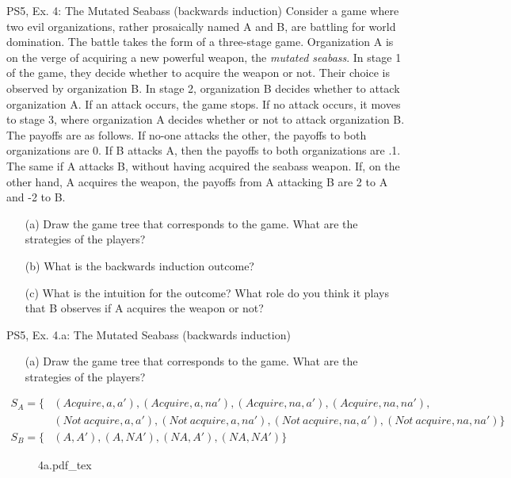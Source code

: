 







\begin{frame}{PS5, Ex. 4: The Mutated Seabass (backwards induction)}
    Consider a game where two evil organizations, rather prosaically named A and B, are battling for world domination. The battle takes the form of a three-stage game. Organization A is on the verge of acquiring a new powerful weapon, the \textit{mutated seabass}. In stage 1 of the game, they decide whether to acquire the weapon or not. Their choice is observed by organization B. In stage 2, organization B decides whether to attack organization A. If an attack occurs, the game stops. If no attack occurs, it moves to stage 3, where organization A decides whether or not to attack organization B. The payoffs are as follows. If no-one attacks the other, the payoffs to both organizations are 0. If B attacks A, then the payoffs to both organizations are .1. The same if A attacks B, without having acquired the seabass weapon. If, on the other hand, A acquires the weapon, the payoffs from A attacking B are 2 to A and -2 to B.
    \begin{itemize}
      \item[(a)] Draw the game tree that corresponds to the game. What are the strategies of the players?
      \item[(b)] What is the backwards induction outcome?
      \item[(c)] What is the intuition for the outcome? What role do you think it plays that B observes if A acquires the weapon or not?
    \end{itemize}
  \vfill\null
\end{frame}

\begin{frame}{PS5, Ex. 4.a: The Mutated Seabass (backwards induction)}
  \begin{itemize}
    \item[(a)] Draw the game tree that corresponds to the game. What are the strategies of the players?
  \end{itemize}
  \vspace{-8pt}
  \begin{align*}
    S_A=\{ &(Acquire, a, a'), (Acquire, a, na'), (Acquire, na, a'), (Acquire, na, na'),\\
            &(Not\ acquire, a, a'), (Not\ acquire, a, na'), (Not\ acquire, na, a'), (Not\ acquire, na, na') \}\\
    S_B=\{ &(A, A'), (A, NA'), (NA, A'), (NA, NA') \}
  \end{align*}
  \vspace{-8pt}
  \begin{figure}[!h]
    \center
    \def\svgwidth{\columnwidth}
    {4a.pdf_tex}
  \end{figure}
  \vfill\null
\end{frame}

